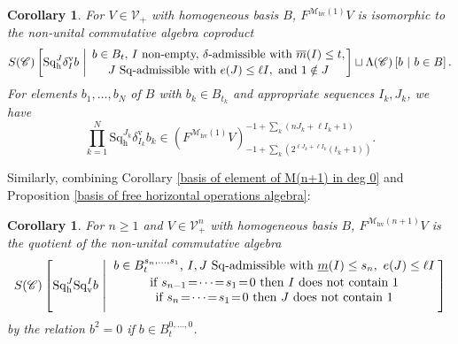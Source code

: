 \documentclass[11pt]{amsart} \renewcommand{\baselinestretch}{1.4}
\theoremstyle{plain}
\newtheorem{cor}[thm]{Corollary}
\theoremstyle{definition}
\newcommand{\scrC}{\mathscr{C}}
\newcommand{\calV}{\mathcal{V}}
\newcommand{\calMhv}{\mathcal{M}_\mathrm{hv}}
\newcommand{\CommOperad}{{\scrC}}
\newcommand{\vect}[2]{\calV^{#1}_{#2}}
\newcommand{\minDimP}{\overline{m}}
\newcommand{\minDimSq}{\underline{m}}
\newcommand{\excess}{e}
\newcommand{\Sq}{\mathrm{Sq}}
\newcommand{\uver}{^\mathrm{v}}
\newcommand{\dver}{_\mathrm{v}}
\newcommand{\dhor}{_\mathrm{h}}
\newcommand{\deltav}{\delta\uver}
\begin{document}
\begin{Cohomology Operations for W and U}
\begin{cor}
\label{calMhv(1) description}
For $V\in\vect{}{+}$ with  homogeneous basis $B$, $F^{\calMhv(1)}V$ is isomorphic to the non-unital commutative algebra coproduct
\[S(\CommOperad) \left[\Sq\dhor^J\deltav_Ib\ \middle|\ \genfrac{}{}{0pt}{}{b\in B_t\textup{, $I$ non-empty, $\delta$-admissible with }\minDimP(I)\leq t,}{\textup{$J$ $\Sq$-admissible with }\excess(J)\leq \ell I,\textup{ and }1\notin J}\right]\sqcup \Lambda(\CommOperad)\left[b\ \middle|\ b\in B\right].\]
For elements $b_1,\ldots,b_N$ of $B$ with $b_k\in B_{t_k}$ and appropriate sequences $I_k,J_k$, we have
\[\textstyle\prod_{k=1}^N \Sq\dhor^{J_k}\deltav_{I_k}b_k\in \left(F^{\calMhv(1)}V\right)^{-1+\sum_k(nJ_k+\ell I_k+1)}_{-1+\sum_k(2^{\ell J_k+\ell I_k}(t_k+1))}.\]
\end{cor}
\noindent Similarly, combining Corollary \ref{basis of element of M(n+1) in deg 0} and Proposition \ref{basis of free horizontal operations algebra}:
\begin{cor}
\label{calMhv(n+1) description}
For $n\geq1$ and $V\in\vect{n}{+}$ with homogeneous basis $B$,  $F^{\calMhv(n+1)}V$ is the quotient of the non-unital commutative algebra
%
%
%
\[S(\CommOperad) \left[\Sq\dhor^J\Sq\dver^Ib\ \middle|\ \genfrac{}{}{0pt}{}{{\displaystyle\genfrac{}{}{0pt}{}{b\in B^{s_{n},\ldots,s_1}_t\textup{, $I,J$ $\Sq$-admissible with }\minDimSq(I)\leq s_n,\ \excess(J)\leq \ell I}{\textup{if }s_{n-1}\!=\!\cdots\!=\!s_1\!=\!0\textup{ then $I$ does not contain 1}}}}{
\textup{if }s_{n}\!=\!\cdots\!=\!s_1\!=\!0\textup{ then $J$ does not contain 1}
}
\right]\]
by the relation $b^2=0$ if $b\in B_t^{0,\ldots,0}$.
\end{cor}



\end{Cohomology Operations for W and U}
\end{document}
